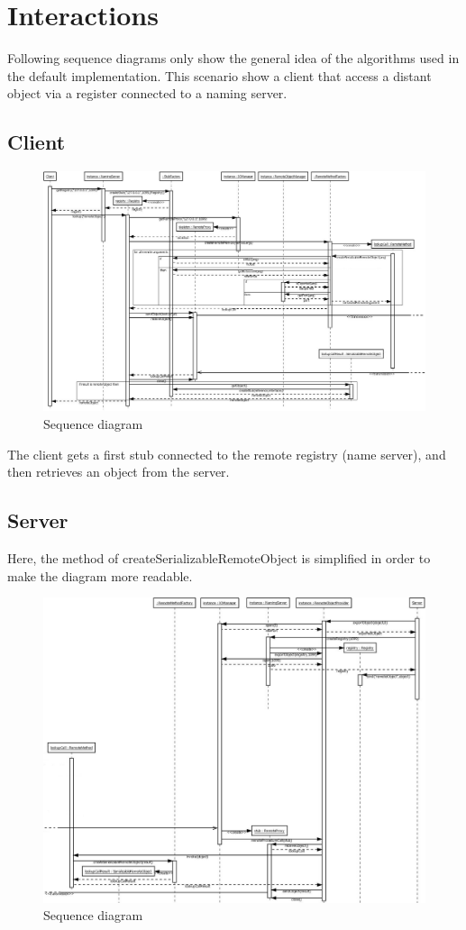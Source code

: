 \chapter{Interactions}

Following sequence diagrams only show the general idea of the algorithms used in the default implementation. This scenario show a client that access a distant object via a register connected to a naming server.

\section{Client}
\begin{figure}[H]
\begin{center}
\includegraphics[scale=0.45,angle=90]{../img/diag_sequence_client.jpeg}
\caption{Sequence diagram}
\end{center}
\end{figure}
\medskip
The client gets a first stub connected to the remote registry (name server), and then retrieves an object from the server.

\section{Server}
Here, the method of createSerializableRemoteObject is simplified in order to make the diagram more readable.
\begin{figure}[H]
\begin{center}
\includegraphics[scale=0.5,angle=90]{../img/diag_sequence_server.jpeg}
\caption{Sequence diagram}
\end{center}
\end{figure}

